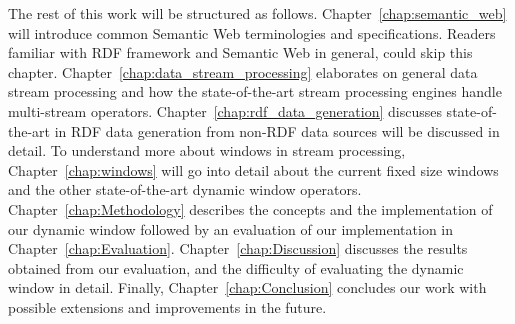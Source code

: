 The rest of this work will be structured as follows. Chapter~\ref{chap:semantic_web} will 
introduce common Semantic Web terminologies and specifications. Readers familiar
with RDF framework and Semantic Web in general, could skip this chapter. 
Chapter~\ref{chap:data_stream_processing} elaborates on general data stream processing 
and how the state-of-the-art stream processing engines handle multi-stream operators. 
Chapter~\ref{chap:rdf_data_generation} discusses state-of-the-art in 
RDF data generation from non-RDF data sources will be discussed in detail. 
To understand more about windows in stream processing, Chapter~\ref{chap:windows}
will go into detail about the current fixed size windows and the other state-of-the-art 
dynamic window operators. Chapter~\ref{chap:Methodology} describes the concepts and the 
implementation of our dynamic window followed by an evaluation of our implementation in 
Chapter~\ref{chap:Evaluation}. Chapter~\ref{chap:Discussion} discusses the results 
obtained from our evaluation, and the difficulty of evaluating the dynamic window in detail. 
Finally, Chapter~\ref{chap:Conclusion} concludes our work with possible extensions and 
improvements in the future. 
